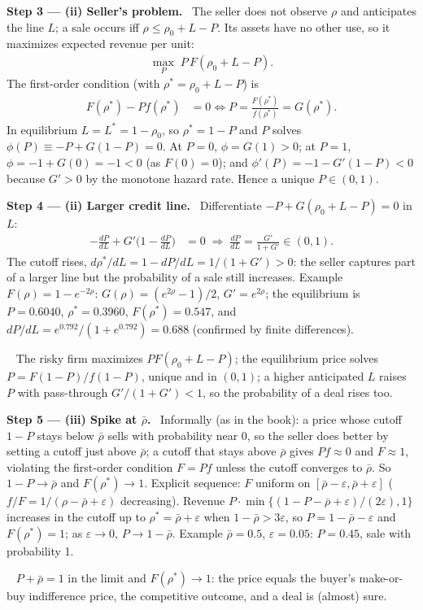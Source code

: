 \documentclass[11pt,a4paper]{article}
\newcommand{\step}[2]{\par\medskip\noindent\textbf{Step #1 --- #2.}~}
\newcommand{\answer}[1]{\par\smallskip\noindent\fbox{\textbf{Answer #1.}}~}
\begin{document}
\step{3}{(ii) Seller's problem} The seller does not observe $\rho$ and anticipates the line $L$; a sale
occurs iff $\rho\le\rho_0+L-P$. Its assets have no other use, so it maximizes expected revenue per unit:
\begin{align}
  \max_P\; P\,F(\rho_0+L-P). \label{r9e15-seller}
\end{align}
The first-order condition (with $\rho^*=\rho_0+L-P$) is
\begin{align}
  F(\rho^*)-Pf(\rho^*) &= 0 \iff P = \frac{F(\rho^*)}{f(\rho^*)}=G(\rho^*). \label{r9e15-foc}
\end{align}
In equilibrium $L=L^*=1-\rho_0$, so $\rho^*=1-P$ and $P$ solves $\phi(P)\equiv -P+G(1-P)=0$. At $P=0$,
$\phi=G(1)>0$; at $P=1$, $\phi=-1+G(0)=-1<0$ (as $F(0)=0$); and $\phi'(P)=-1-G'(1-P)<0$ because $G'>0$ by the
monotone hazard rate. Hence a unique $P\in(0,1)$.

\step{4}{(ii) Larger credit line} Differentiate $-P+G(\rho_0+L-P)=0$ in $L$:
\begin{align}
  -\frac{dP}{dL}+G'\Big(1-\frac{dP}{dL}\Big) &= 0 \;\Rightarrow\; \frac{dP}{dL}=\frac{G'}{1+G'}\in(0,1). \label{r9e15-dPdL}
\end{align}
The cutoff rises, $d\rho^*/dL=1-dP/dL=1/(1+G')>0$: the seller captures part of a larger line but the
probability of a sale still increases. Example $F(\rho)=1-e^{-2\rho}$: $G(\rho)=(e^{2\rho}-1)/2$,
$G'=e^{2\rho}$; the equilibrium is $P=0.6040$, $\rho^*=0.3960$, $F(\rho^*)=0.547$, and
$dP/dL=e^{0.792}/(1+e^{0.792})=0.688$ (confirmed by finite differences).
\answer{(ii)} The risky firm maximizes $PF(\rho_0+L-P)$; the equilibrium price solves $P=F(1-P)/f(1-P)$,
unique and in $(0,1)$; a higher anticipated $L$ raises $P$ with pass-through $G'/(1+G')<1$, so the
probability of a deal rises too.

\step{5}{(iii) Spike at $\bar\rho$} Informally (as in the book): a price whose cutoff $1-P$ stays below
$\bar\rho$ sells with probability near 0, so the seller does better by setting a cutoff just above
$\bar\rho$; a cutoff that stays above $\bar\rho$ gives $Pf\approx0$ and $F\approx1$, violating the
first-order condition $F=Pf$ unless the cutoff converges to $\bar\rho$. So $1-P\to\bar\rho$ and $F(\rho^*)\to1$.
Explicit sequence: $F$ uniform on $[\bar\rho-\varepsilon,\bar\rho+\varepsilon]$ ($f/F=1/(\rho-\bar\rho+\varepsilon)$
decreasing). Revenue $P\cdot\min\{(1-P-\bar\rho+\varepsilon)/(2\varepsilon),1\}$ increases in the cutoff up to
$\rho^*=\bar\rho+\varepsilon$ when $1-\bar\rho>3\varepsilon$, so $P=1-\bar\rho-\varepsilon$ and $F(\rho^*)=1$; as
$\varepsilon\to0$, $P\to1-\bar\rho$. Example $\bar\rho=0.5$, $\varepsilon=0.05$: $P=0.45$, sale with probability 1.
\answer{(iii)} $P+\bar\rho=1$ in the limit and $F(\rho^*)\to1$: the price equals the buyer's make-or-buy
indifference price, the competitive outcome, and a deal is (almost) sure.
\end{document}
